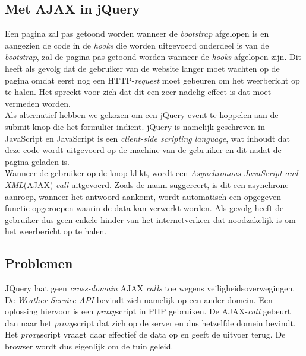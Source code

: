 \subsection{Met AJAX in jQuery}
Een pagina zal pas getoond worden wanneer de \textit{bootstrap} afgelopen is en aangezien de code in de \textit{hooks} die worden uitgevoerd onderdeel is van de \textit{bootstrap}, zal de pagina pas getoond worden wanneer de \textit{hooks} afgelopen zijn. Dit heeft als gevolg dat de gebruiker van de website langer moet wachten op de pagina omdat eerst nog een HTTP-\textit{request} moet gebeuren om het weerbericht op te halen. Het spreekt voor zich dat dit een zeer nadelig effect is dat moet vermeden worden.\\
Als alternatief hebben we gekozen om een jQuery-event te koppelen aan de submit-knop die het formulier indient. jQuery is namelijk geschreven in JavaScript en JavaScript is een \textit{client-side \textit{scripting} language}, wat inhoudt dat deze code wordt uitgevoerd op de machine van de gebruiker en dit nadat de pagina geladen is.\\
Wanneer de gebruiker op de knop klikt, wordt een \textit{Asynchronous JavaScript and XML}(AJAX)-\textit{call} uitgevoerd.
Zoals de naam suggereert, is dit een asynchrone aanroep, wanneer het antwoord aankomt, wordt automatisch een opgegeven functie opgeroepen waarin de data kan verwerkt worden. Als gevolg heeft de gebruiker dus geen enkele hinder van het internetverkeer dat noodzakelijk is om het weerbericht op te halen.

\subsection{Problemen}
JQuery laat geen \textit{cross-domain} AJAX \textit{calls} toe wegens veiligheidsoverwegingen. De \textit{Weather Service API} bevindt zich namelijk op een ander domein. Een oplossing hiervoor is een \textit{proxy}script in PHP gebruiken.
De AJAX-\textit{call} gebeurt dan naar het \textit{proxy}script dat zich op de server en dus hetzelfde domein bevindt. Het \textit{proxy}script vraagt daar effectief de data op en geeft de uitvoer terug.
De browser wordt dus eigenlijk om de tuin geleid. \cite{crossDomainProblem}
